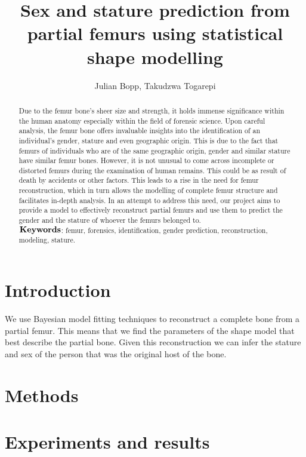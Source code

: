 \documentclass[10pt]{article}
\author{Julian Bopp, Takudzwa Togarepi}
\title{Sex and stature prediction from partial femurs using statistical shape modelling}
\theoremstyle{definition}
\begin{document}
\maketitle

\begin{abstract}
\noindent
Due to the femur bone's sheer size and strength, it holds immense significance within the human anatomy especially within the field of forensic science. Upon careful analysis, the femur bone offers invaluable insights into the identification of an individual's gender, stature and even geographic origin. This is due to the fact that femurs of individuals who are of the same geographic origin, gender and similar stature have similar femur bones. However, it is not unusual to come across incomplete or distorted femurs during the examination of human remains. This could be as result of death by accidents or other factors. This leads to a rise in the need for femur reconstruction, which in turn allows the modelling of complete femur structure and facilitates in-depth analysis. In an attempt to address this need, our project aims to  provide a model to effectively reconstruct partial femurs and use them to predict the gender and the stature of whoever the femurs belonged to.\\

\noindent
$\bold{Keywords}$: femur, forensics, identification, gender prediction, reconstruction, modeling, stature.\\

\end{abstract}
\section{Introduction}

We use Bayesian model fitting techniques to reconstruct a complete bone from a partial femur. This means that we find the parameters of the shape model that best describe the partial bone. Given this reconstruction we can infer the stature and sex of the person that was the original host of the bone.
\section{Methods}



\section{Experiments and results}
\end{document}
